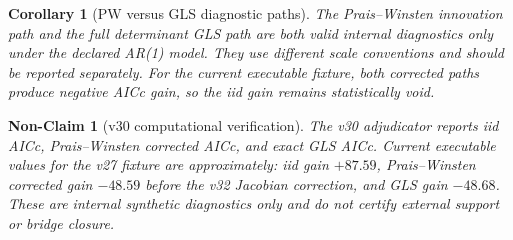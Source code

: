 \documentclass[11pt]{article}
\newtheorem{corollary}{Corollary}
\newtheorem{nonclaim}{Non-Claim}
\begin{document}
\begin{corollary}[PW versus GLS diagnostic paths]\label{cor:gls-co-diff}
The Prais--Winsten innovation path and the full determinant GLS path are both valid internal diagnostics only under the declared AR(1) model. They use different scale conventions and should be reported separately. For the current executable fixture, both corrected paths produce negative AICc gain, so the iid gain remains statistically void.
\end{corollary}

\begin{nonclaim}[v30 computational verification]
The v30 adjudicator reports iid AICc, Prais--Winsten corrected AICc, and exact GLS AICc. Current executable values for the v27 fixture are approximately: iid gain $+87.59$, Prais--Winsten corrected gain $-48.59$ before the v32 Jacobian correction, and GLS gain $-48.68$. These are internal synthetic diagnostics only and do not certify external support or bridge closure.
\end{nonclaim}
\end{document}
